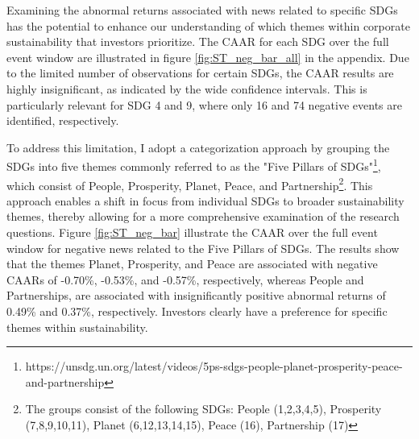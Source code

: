 Examining the abnormal returns associated with news related to specific SDGs has the potential to enhance our understanding of which themes within corporate sustainability that investors prioritize. The CAAR for each SDG over the full event window are illustrated in figure \ref{fig:ST_neg_bar_all} in the appendix. Due to the limited number of observations for certain SDGs, the CAAR results are highly insignificant, as indicated by the wide confidence intervals. This is particularly relevant for SDG 4 and 9, where only 16 and 74 negative events are identified, respectively. 

To address this limitation, I adopt a categorization approach by grouping the SDGs into five themes commonly referred to as the "Five Pillars of SDGs"\footnote{https://unsdg.un.org/latest/videos/5ps-sdgs-people-planet-prosperity-peace-and-partnership}, which consist of People, Prosperity, Planet, Peace, and Partnership\footnote{The groups consist of the following SDGs: People (1,2,3,4,5), Prosperity (7,8,9,10,11), Planet (6,12,13,14,15), Peace (16), Partnership (17)}.
This approach enables a shift in focus from individual SDGs to broader sustainability themes, thereby allowing for a more comprehensive examination of the research questions. Figure \ref{fig:ST_neg_bar} illustrate the CAAR over the full event window for negative news related to the Five Pillars of SDGs.
The results show that the themes Planet, Prosperity, and Peace are associated with negative CAARs of -0.70\%, -0.53\%, and -0.57\%, respectively, whereas People and Partnerships, are associated with insignificantly positive abnormal returns of 0.49\% and 0.37\%, respectively. Investors clearly have a preference for specific themes within sustainability. 

